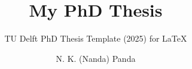 \documentclass{layout/PhD_thesis_template_2025_TU_Delft}
\begin{document}
\frontmatter


\title{\textbf{My PhD Thesis}}

\subtitle{TU Delft PhD Thesis Template (2025) for \LaTeX} 

\author{N. K. (Nanda) Panda}
\subject{Delft University of Technology }
\makecover





\tableofcontents



\mainmatter





\appendix



\end{document}
